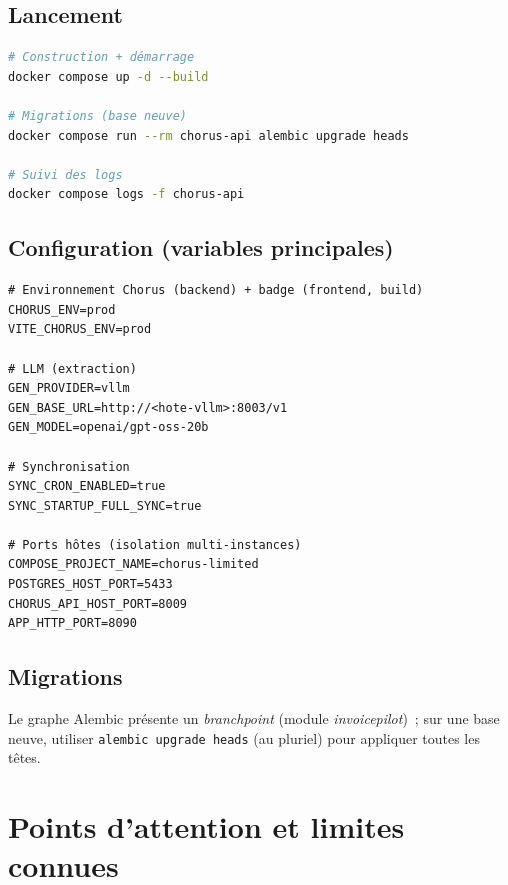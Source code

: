 \documentclass[11pt,a4paper]{article}
\newcommand{\code}[1]{\texttt{\small #1}}
\begin{document}
\subsection{Lancement}
\begin{lstlisting}[language=bash]
# Construction + démarrage
docker compose up -d --build

# Migrations (base neuve)
docker compose run --rm chorus-api alembic upgrade heads

# Suivi des logs
docker compose logs -f chorus-api
\end{lstlisting}

\subsection{Configuration (variables principales)}
\begin{lstlisting}
# Environnement Chorus (backend) + badge (frontend, build)
CHORUS_ENV=prod
VITE_CHORUS_ENV=prod

# LLM (extraction)
GEN_PROVIDER=vllm
GEN_BASE_URL=http://<hote-vllm>:8003/v1
GEN_MODEL=openai/gpt-oss-20b

# Synchronisation
SYNC_CRON_ENABLED=true
SYNC_STARTUP_FULL_SYNC=true

# Ports hôtes (isolation multi-instances)
COMPOSE_PROJECT_NAME=chorus-limited
POSTGRES_HOST_PORT=5433
CHORUS_API_HOST_PORT=8009
APP_HTTP_PORT=8090
\end{lstlisting}

\subsection{Migrations}
Le graphe Alembic présente un \emph{branchpoint} (module \emph{invoicepilot})~;
sur une base neuve, utiliser \code{alembic upgrade heads} (au pluriel) pour
appliquer toutes les têtes.

\section{Points d'attention et limites connues}
\end{document}
